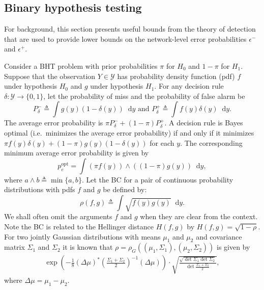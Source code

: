 \documentclass[conference,letterpaper]{IEEEtran}
\newcommand{\defeq}{\triangleq}
\newcommand{\T}{^{*}}%
\renewcommand{\d}{\mathop{}\!\mathrm{d}}%
\newcommand{\distA}{f}%
\newcommand{\distB}{g}%
\newcommand{\fnrNet}{\epsilon^-}%
\newcommand{\fprNet}{\epsilon^+}%
\newcommand{\fnrHT}{P^-}%
\newcommand{\fprHT}{P^+}%
\newcommand{\meanDiff}{\Delta\mu}%
\newcommand{\errorOpt}{p_e^{\mathrm{opt}}}
\begin{document}
\subsection{Binary hypothesis testing}
\label{sec:bht}
For background, this section presents useful bounds from the
theory of detection that are used to provide lower bounds on the
network-level error probabilities $\fnrNet$ and $\fprNet$.

Consider a BHT problem with prior probabilities $\pi$ for $H_0$ and
$1 - \pi$ for $H_1$.  Suppose that the observation $Y\in\mathcal Y$
has probability density function (pdf) $\distA$ under hypothesis $H_0$
and $\distB$ under hypothesis $H_1$.  For any decision rule
$\delta\colon \mathcal Y \to \{0, 1\}$, let the probability of miss
and the probability of false alarm be
\[\fnrHT_\delta \defeq\int g(y)(1 - \delta(y))\d y \mbox{ and }
  \fprHT_\delta\defeq \int f(y)\delta(y)\d y.\]
The average error probability is
$\pi\fnrHT_\delta + (1 - \pi)\fprHT_\delta$.  A decision rule is Bayes
optimal (i.e.\ minimizes the average error probability) if and only if
it minimizes $\pi\distA(y)\delta(y) + (1-\pi)\distB(y)(1-\delta(y))$
for each $y$.  The corresponding minimum average error probability is
given by
\begin{equation}
  \label{eq:avg-prob-error}
  \errorOpt = \int (\pi\distA(y)) \wedge ((1 - \pi)\distB(y))\d y,
\end{equation}
where $a\wedge b \defeq \min\{a, b\}$.  Let the BC for a pair of
continuous probability distributions with pdfs $\distA$ and $\distB$
be defined by:
\[\rho(\distA, \distB) \defeq \int\sqrt{\distA(y) \distB(y)}\d y.\]
We shall often omit the arguments $\distA$ and $\distB$ when they are
clear from the context.  Note the BC is related to the Hellinger
distance $H(f, g)$ by $H(f, g) = \sqrt{1 - \rho}$.  For two jointly
Gaussian distributions with means $\mu_1$ and $\mu_2$ and covariance
matrix $\Sigma_1$ and $\Sigma_2$ it is known that
$\rho = \rho_G((\mu_1, \Sigma_1), (\mu_2, \Sigma_2))$ is given by
\begin{align*}
  \exp\left(-\frac 18 (\meanDiff)\T\left(\frac{\Sigma_1 +
  \Sigma_2}2\right)^{-1}(\meanDiff)\right) \cdot\sqrt{\frac{\sqrt{\det
  \Sigma_1\det\Sigma_2}}{\det\frac{\Sigma_1 + \Sigma_2}2}},
\end{align*}
where $\meanDiff = \mu_1 - \mu_2$.
\end{document}
